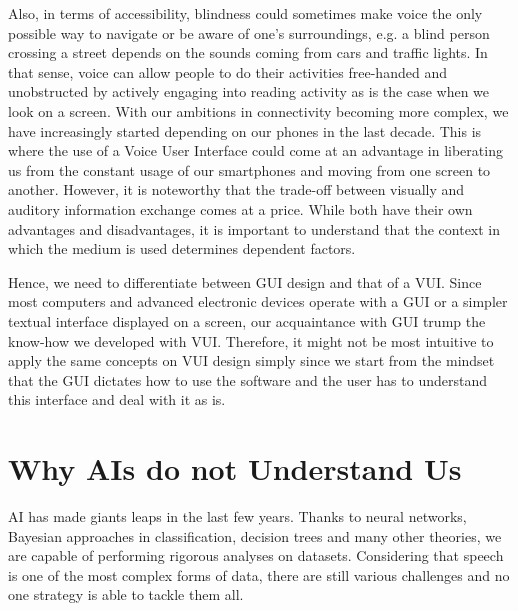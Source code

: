 Also, in terms of accessibility, blindness could sometimes make voice the only possible way to navigate or be aware of one's surroundings, e.g. a blind person crossing a street depends on the sounds coming from cars and traffic lights.
In that sense, voice can allow people to do their activities free-handed and unobstructed by actively engaging into reading activity %
as is the case when we look on a screen.
With our ambitions in connectivity becoming more complex, we have %
increasingly started depending on our phones in the last decade.
This is where the use of a Voice User Interface could come at an advantage in liberating us from the constant usage of our smartphones and moving from one screen to another. 
However, it is noteworthy that the trade-off between visually and auditory information exchange comes at a price. While both have their own advantages and disadvantages, it is important to understand that the context in which the medium is used determines dependent factors.

Hence, we need to differentiate between GUI design and that of a VUI. Since most computers and advanced electronic devices operate with a GUI or a simpler textual interface displayed on a screen, our acquaintance with GUI trump the know-how we developed with VUI. %
Therefore, it might not be most intuitive to apply the same concepts on VUI design simply since we start from the mindset that the GUI dictates how to use the software and the user has to understand this interface and deal with it as is.







\section{Why AIs do not Understand Us}

AI has made giants leaps in the last few years. Thanks to neural networks, Bayesian approaches in classification, decision trees and many other theories, we are capable of performing rigorous analyses on datasets.
Considering that speech is one of the most complex forms of data, there are still various challenges and no one strategy is able to tackle them all. %

